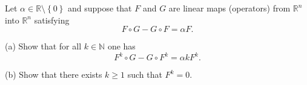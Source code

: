 \begin{problem}
    Let \( \alpha \in \mathbb{R} \setminus \left\{0\right\} \) and suppose that \( F \) and \( G \) are linear maps (operators) from \( \mathbb{R}^n \) into \( \mathbb{R}^n \) satisfying
    \[
        F \circ G - G \circ F = \alpha F.
    \]

    (a) Show that for all \( k \in \mathbb{N} \) one has
    \[
        F^k \circ G - G \circ F^k = \alpha k F^k.
    \]

    (b) Show that there exists \( k \geq 1 \) such that \( F^k = 0 \).
\end{problem}
